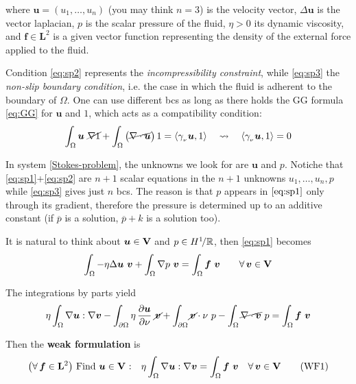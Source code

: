 where $\bm u=(u_1,\dots,u_n)$ (you may think $n=3$) is the velocity vector, $\Delta\bm u$ is the vector laplacian, $p$ is the scalar pressure of the fluid, $\eta>0$ its dynamic viscosity, and $\bm f\in\mathbf{L}^2$ is a given vector function representing the density of the external force applied to the fluid.

Condition \eqref{eq:sp2} represents the \emph{incompressibility constraint}, while \eqref{eq:sp3} the \emph{non-slip boundary condition}, i.e. the case in which the fluid is adherent to the boundary of $\Omega$. One can use different bcs as long as there holds the GG formula \eqref{eq:GG} for $\bm u$ and $1$, which acts as a compatibility condition:
\begin{equation*}
\int_\Omega \bm u\ \cancel{\nabla 1} + \int_\Omega \big(\cancel{\nabla\cdot \bm u}\big)\, 1= \left\langle \gamma_{_\nu}\bm u, 1 \right\rangle\quad\leadsto\quad \left\langle \gamma_{_\nu}\bm u, 1 \right\rangle=0
\end{equation*}

In system \eqref{Stokes-problem}, the unknowns we look for are $\bm u$ and $p$. Notiche that \eqref{eq:sp1}+\eqref{eq:sp2} are $n+1$ scalar equations in the $n+1$ unknowns $u_1,\dots,u_n,p$ while \eqref{eq:sp3} gives just $n$ bcs. The reason is that $p$ appears in $\eqref{eq:sp1}$ only through its gradient, therefore the pressure is determined up to an additive constant (if $\overline{p}$ is a solution, $\overline{p}+k$ is a solution too). 

\noindent\rlap{\rule[1.5ex]{0.495\textwidth}{.2pt}}

\vspace{-0.5em}


It is natural to think about $\bm u\in\mathbf{V}$ and $p\in H^1\!/\mathbb{R}$, then \eqref{eq:sp1} becomes
\begin{equation*}
\int_\Omega -\eta\Delta\bm u\ \bm v +\int_\Omega \nabla p\ \bm v =\int_\Omega \bm f\ \bm v\qquad \forall\, \bm v\in\mathbf{V}
\end{equation*}

The integrations by parts yield
\begin{equation*}
\eta \int_\Omega \nabla\bm u:\nabla\bm v-\int_{\partial\Omega}\eta\,\frac{\partial \bm u}{\partial \nu}\ \cancel{\bm v}+\int_{\partial\Omega} \cancel{\bm v} \cdot \nu\ p -\int_\Omega \cancel{\nabla\cdot\bm v}\ p = \int_\Omega \bm f\ \bm v
\end{equation*}

Then the \textbf{weak formulation} is 
\begin{equation*}
\big(\forall\,\bm f\in\mathbf{L}^2\big)\text{ Find }\bm u\in \mathbf{V}\text{ :}\quad \eta\int_\Omega \nabla \bm u : \nabla \bm v=\int_\Omega \bm f\ \bm v\quad \forall\,\bm v\in\mathbf{V}\tag{WF1}
\end{equation*}

